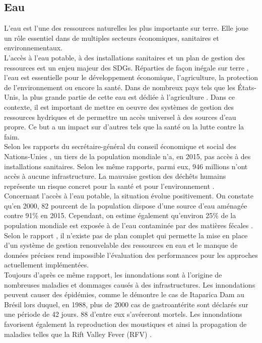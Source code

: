 \documentclass[10pt, article]{llncs}
\begin{document}
	\subsection{Eau}
			L'eau est l'une des ressources naturelles les plus importante sur terre. Elle joue un rôle essentiel dans de multiples secteurs économiques, sanitaires et environnementaux.\\
			L'accès à l'eau potable, à des installations sanitaires et un plan de gestion des ressources est un enjeu majeur des SDGs. Réparties de façon inégale sur terre \cite{lefevre_repartition_nodate}
			, l'eau est essentielle pour le développement économique, l'agriculture, la protection de l'environnement ou encore la santé. Dans de nombreux pays tels que les États-Unis, la plus grande partie de cette eau est dédiée à l'agriculture \cite{world_business_council_for_sustainable_development_global_nodate}.
			Dans ce contexte, il est important de mettre en oeuvre des systèmes de gestion des ressources hydriques et de permettre un accès universel à des sources d'eau propre. Ce but a un impact sur d'autres tels que la santé ou la lutte contre la faim.\\
			Selon les rapports du secrétaire-général du conseil économique et social des Nations-Unies \cite{united_nations_economic_and_social_council_progress_2017}\cite{united_nations_economic_and_social_council_progress_2017-1}, un tiers de la population mondiale n'a, en 2015, pas accès à des installations sanitaires. Selon les même rapports, parmi eux, 946 millions n'ont accès à aucune infrastructure. La mauvaise gestion des déchêts humains représente un risque concret pour la santé et pour l'environnement \cite{ashbolt_microbial_2004}.\\
			Concernant l'accès à l'eau potable, la situation évolue positivement. On constate qu'en 2000, 82 pourcent de la population dispose d'une source d'eau aménagée contre 91\% en 2015. Cependant, on estime également qu'environ 25\% de la population mondiale est exposée à de l'eau contaminée par des matières fécales \cite{united_nations_goal_nodate-4}. \\
			Selon le rapport \cite{rana_water_2017}, il n'existe pas de plan complet qui permette la mise en place d'un système de gestion renouvelable des ressources en eau et le manque de données précises rend impossible l'évaluation des performances pour les approches actuellement implémentées. \\
			Toujours d'après ce même rapport, les innondations sont à l'origine de nombreuses maladies et dommages causés à des infrastructures. Les innondations peuvent causer des épidémies, comme le démontre le cas de Itaparica Dam au Brésil lors duquel, en 1988, plus de 2000 cas de gastroantérite sont déclarés sur une période de 42 jours. 88 d'entre eux s'avéreront mortels. Les innondations favorisent également la reproduction des moustiques et ainsi la propagation de maladies telles que la Rift Valley Fever (RFV) \cite{hanafi_rift_2010}.\\
\end{document}
